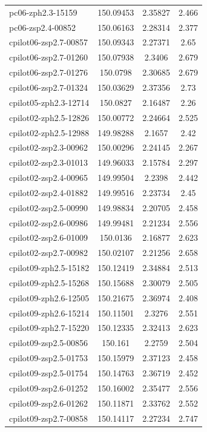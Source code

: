 \documentclass[twocolumn,tight,times]{aastex63}
\begin{document}
\begin{center}
\begin{longtable}{l|c|c|c}
pc06-zph2.3-15159 & 150.09453 & 2.35827 & 2.466 \\
pc06-zsp2.4-00852 & 150.06163 & 2.28314 & 2.377 \\
cpilot06-zsp2.7-00857 & 150.09343 & 2.27371 & 2.65 \\
cpilot06-zsp2.7-01260 & 150.07938 & 2.3406 & 2.679 \\
cpilot06-zsp2.7-01276 & 150.0798 & 2.30685 & 2.679 \\
cpilot06-zsp2.7-01324 & 150.03629 & 2.37356 & 2.73 \\
cpilot05-zph2.3-12714 & 150.0827 & 2.16487 & 2.26 \\
cpilot02-zph2.5-12826 & 150.00772 & 2.24664 & 2.525 \\
cpilot02-zph2.5-12988 & 149.98288 & 2.1657 & 2.42 \\
cpilot02-zsp2.3-00962 & 150.00296 & 2.24145 & 2.267 \\
cpilot02-zsp2.3-01013 & 149.96033 & 2.15784 & 2.297 \\
cpilot02-zsp2.4-00965 & 149.99504 & 2.2398 & 2.442 \\
cpilot02-zsp2.4-01882 & 149.99516 & 2.23734 & 2.45 \\
cpilot02-zsp2.5-00990 & 149.98834 & 2.20705 & 2.458 \\
cpilot02-zsp2.6-00986 & 149.99481 & 2.21234 & 2.556 \\
cpilot02-zsp2.6-01009 & 150.0136 & 2.16877 & 2.623 \\
cpilot02-zsp2.7-00982 & 150.02107 & 2.21256 & 2.658 \\
cpilot09-zph2.5-15182 & 150.12419 & 2.34884 & 2.513 \\
cpilot09-zph2.5-15268 & 150.15688 & 2.30079 & 2.505 \\
cpilot09-zph2.6-12505 & 150.21675 & 2.36974 & 2.408 \\
cpilot09-zph2.6-15214 & 150.11501 & 2.3276 & 2.551 \\
cpilot09-zph2.7-15220 & 150.12335 & 2.32413 & 2.623 \\
cpilot09-zsp2.5-00856 & 150.161 & 2.2759 & 2.504 \\
cpilot09-zsp2.5-01753 & 150.15979 & 2.37123 & 2.458 \\
cpilot09-zsp2.5-01754 & 150.14763 & 2.36719 & 2.452 \\
cpilot09-zsp2.6-01252 & 150.16002 & 2.35477 & 2.556 \\
cpilot09-zsp2.6-01262 & 150.11871 & 2.33762 & 2.552 \\
cpilot09-zsp2.7-00858 & 150.14117 & 2.27234 & 2.747 \\

\end{longtable}
\end{center}
\end{document}
